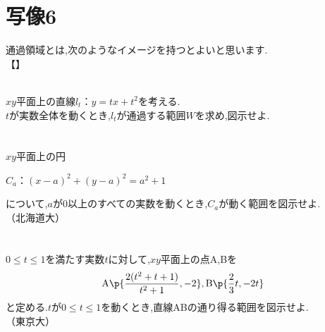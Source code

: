 \documentclass[10pt,fleqn,a4paper]{jsarticle}
\newcommand{\theme}[1]{【\text{#1}】}
\begin{document}
\section{写像6}
通過領域とは,次のようなイメージを持つとよいと思います.\\
\theme{イメージ}
\newpage

\noindent{}\\
$xy$平面上の直線$l_t：y=tx+t^2$を考える.\\
$t$が実数全体を動くとき,$l_t$が通過する範囲$W$を求め,図示せよ.\\\\
\\
$xy$平面上の円
\begin{center}
    $C_a：(x-a)^2+(y-a)^2=a^2+1$
\end{center}
について,$a$が0以上のすべての実数を動くとき,$C_a$が動く範囲を図示せよ.\\
\hspace{10cm}（北海道大）\\\\
\\
$0\leq t\leq1$を満たす実数$t$に対して,$xy$平面上の点A,Bを
\begin{align*}
    \mathrm{A}\p{\dfrac{2(t^2+t+1)}{t^2+1},-2},\mathrm{B}\p{\dfrac{2}{3}t,-2t}
\end{align*}
と定める.$t$が$0\leq t\leq1$を動くとき,直線ABの通り得る範囲を図示せよ.\\
\hspace{10cm}（東京大）
\end{document}
